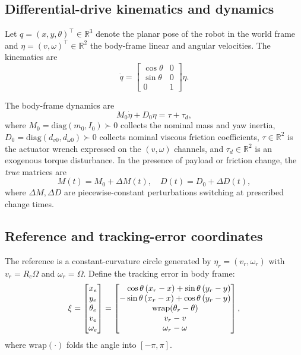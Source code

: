 \documentclass[conference]{IEEEtran}
\newcommand{\R}{\mathbb{R}}
\begin{document}
\subsection{Differential-drive kinematics and dynamics}

Let $q=(x,y,\theta)^\top\in\R^3$ denote the planar pose of the robot in the
world frame and $\eta=(v,\omega)^\top\in\R^2$ the body-frame linear and
angular velocities. The kinematics are
\begin{equation}
\dot q=
\begin{bmatrix}\cos\theta & 0\\ \sin\theta & 0\\ 0 & 1\end{bmatrix}\eta.
\label{eq:kin}
\end{equation}

The body-frame dynamics are
\begin{equation}
M_0\dot\eta+D_0\eta=\tau+\tau_d,
\label{eq:dyn}
\end{equation}
where $M_0=\mathrm{diag}(m_0,I_0)\succ 0$ collects the nominal mass and yaw
inertia, $D_0=\mathrm{diag}(d_{v0},d_{\omega 0})\succ 0$ collects nominal
viscous friction coefficients, $\tau\in\R^2$ is the actuator wrench expressed
on the $(v,\omega)$ channels, and $\tau_d\in\R^2$ is an exogenous torque
disturbance. In the presence of payload or friction change, the \emph{true}
matrices are
\begin{equation}
M(t)=M_0+\Delta M(t),\quad D(t)=D_0+\Delta D(t),
\label{eq:perturb}
\end{equation}
where $\Delta M,\Delta D$ are piecewise-constant perturbations switching at
prescribed change times.

\subsection{Reference and tracking-error coordinates}

The reference is a constant-curvature circle generated by
$\eta_r=(v_r,\omega_r)$ with $v_r=R_c\Omega$ and $\omega_r=\Omega$. Define
the tracking error in body frame:
\begin{equation}
\xi=\begin{bmatrix} x_e\\ y_e\\ \theta_e\\ v_e\\ \omega_e\end{bmatrix}
=\begin{bmatrix}
\hphantom{-}\cos\theta\,(x_r-x)+\sin\theta\,(y_r-y)\\
-\sin\theta\,(x_r-x)+\cos\theta\,(y_r-y)\\
\mathrm{wrap}(\theta_r-\theta)\\
v_r-v\\ \omega_r-\omega
\end{bmatrix},
\label{eq:err}
\end{equation}
where $\mathrm{wrap}(\cdot)$ folds the angle into $[-\pi,\pi]$.
\end{document}
